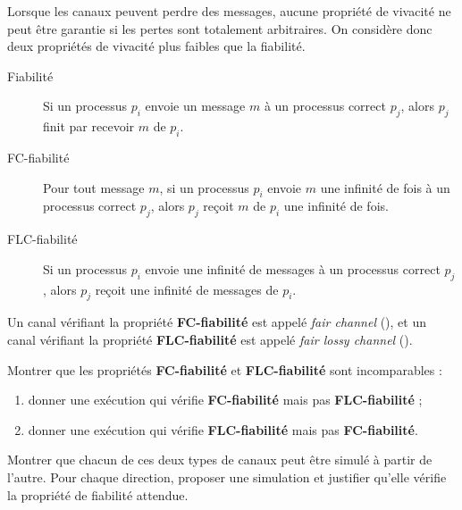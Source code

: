 
\begingroup


\begin{exercice}

  Lorsque les canaux peuvent perdre des messages, aucune propriété de vivacité
  ne peut être garantie si les pertes sont totalement arbitraires.
  On considère donc deux propriétés de vivacité plus faibles que la fiabilité.

  \begin{description}
  \item[Fiabilité]
    Si un processus $p_i$ envoie un message $m$ à un processus correct $p_j$,
    alors $p_j$ finit par recevoir $m$ de $p_i$.

  \item[FC-fiabilité]
    Pour tout message $m$, si un processus $p_i$ envoie $m$ une infinité de fois
    à un processus correct $p_j$, alors $p_j$ reçoit $m$ de $p_i$ une infinité
    de fois.

  \item[FLC-fiabilité]
    Si un processus $p_i$ envoie une infinité de messages à un processus correct
    $p_j$, alors $p_j$ reçoit une infinité de messages de $p_i$.
  \end{description}

  Un canal vérifiant la propriété \textbf{FC-fiabilité} est appelé
  \emph{fair channel} (\FC), et un canal vérifiant la propriété
  \textbf{FLC-fiabilité} est appelé \emph{fair lossy channel} (\FLC).

  \begin{questions}
  \item Montrer que les propriétés \textbf{FC-fiabilité} et
    \textbf{FLC-fiabilité} sont incomparables :
    \begin{enumerate}
    \item donner une exécution qui vérifie \textbf{FC-fiabilité} mais pas
      \textbf{FLC-fiabilité} ;
    \item donner une exécution qui vérifie \textbf{FLC-fiabilité} mais pas
      \textbf{FC-fiabilité}.
    \end{enumerate}

  \item Montrer que chacun de ces deux types de canaux peut être simulé à
    partir de l'autre.
    Pour chaque direction, proposer une simulation et justifier qu'elle
    vérifie la propriété de fiabilité attendue.
  \end{questions}

\end{exercice}

\endgroup
\endinput
